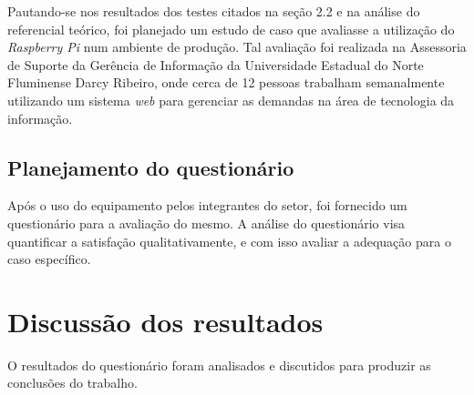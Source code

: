 Pautando-se nos resultados dos testes citados na seção 2.2 e na análise do referencial teórico, foi planejado um estudo de caso que avaliasse a utilização do \textit{Raspberry Pi} num ambiente de produção. Tal avaliação foi realizada na Assessoria de Suporte da Gerência de Informação da Universidade Estadual do Norte Fluminense Darcy Ribeiro, onde cerca de 12 pessoas trabalham semanalmente utilizando um sistema \textit{web} para gerenciar as demandas na área de tecnologia da informação.

\subsection{Planejamento do questionário}

Após o uso do equipamento pelos integrantes do setor, foi fornecido um questionário para a avaliação do mesmo. A análise do questionário visa quantificar a satisfação qualitativamente, e com isso avaliar a adequação para o caso específico.

\section{Discussão dos resultados}

O resultados do questionário foram analisados e discutidos para produzir as conclusões do trabalho.